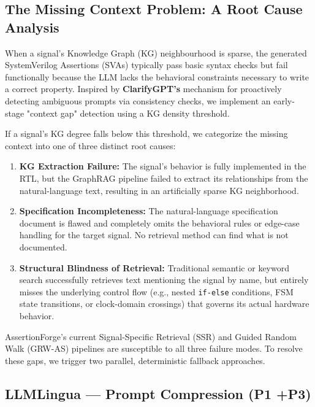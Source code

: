 \documentclass[12pt,a4paper]{article}
\begin{document}
\subsection{The Missing Context Problem: A Root Cause Analysis}

When a signal's Knowledge Graph (KG) neighbourhood is sparse, the generated SystemVerilog Assertions (SVAs) typically pass basic syntax checks but fail functionally because the LLM lacks the behavioral constraints necessary to write a correct property. Inspired by \textbf{ClarifyGPT's} mechanism for proactively detecting ambiguous prompts via consistency checks, we implement an early-stage "context gap" detection using a KG density threshold. 

If a signal's KG degree falls below this threshold, we categorize the missing context into one of three distinct root causes:

\begin{enumerate}[label=\textbf{Cause \Alph*:}, leftmargin=*, itemsep=0.3em]
  \item \textbf{KG Extraction Failure:} The signal's behavior is fully implemented in the RTL, but the GraphRAG pipeline failed to extract its relationships from the natural-language text, resulting in an artificially sparse KG neighborhood.
  \item \textbf{Specification Incompleteness:} The natural-language specification document is flawed and completely omits the behavioral rules or edge-case handling for the target signal. No retrieval method can find what is not documented.
  \item \textbf{Structural Blindness of Retrieval:} Traditional semantic or keyword search successfully retrieves text mentioning the signal by name, but entirely misses the underlying control flow (e.g., nested \texttt{if-else} conditions, FSM state transitions, or clock-domain crossings) that governs its actual hardware behavior.
\end{enumerate}

AssertionForge's current Signal-Specific Retrieval (SSR) and Guided Random Walk (GRW-AS) pipelines are susceptible to all three failure modes. To resolve these gaps, we trigger two parallel, deterministic fallback approaches.

\subsection{LLMLingua --- Prompt Compression (P1 +P3)}
\end{document}
